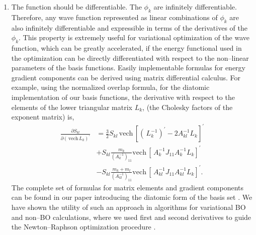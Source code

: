 \begin{enumerate}
\item  
The function should be differentiable.
The $\phi_k$ are infinitely 
differentiable. Therefore, any wave function 
represented as linear combinations 
of $\phi_k$ are also infinitely
differentiable and expressible in terms 
of the derivatives of the $\phi_k$.
This property is extremely useful for
variational optimization of the wave function,
which can be greatly accelerated, if 
the energy functional used in the optimization
can be directly differentiated with respect
to the non--linear parameters of the basis 
functions.
Easily implementable formulas for energy  gradient 
components can be derived
using matrix differential 
calculus\cite{Kinghorn95a}.
For example, using the normalized overlap formula, for the diatomic
implementation of our basis functions, the derivative with
respect to the elements of the lower triangular matrix $L_{k}$, 
(the Cholesky factors of the exponent matrix) is,
\begin{align}
\frac{\partial S_{kl}}{\partial\left(  \,\mathrm{vech}\,L_{k}\right)
^{\prime}}  &  =\frac{3}{2}S_{kl}\,\mathrm{vech}\,\left[  \left(  \,L_{k}%
^{-1}\right)  ^{\prime}-2A_{kl}^{-1}L_{k}\right]  ^{\prime}\nonumber\\
&  +S_{kl}\frac{m_{k}}{\left(  A_{k}^{-1}\right)  _{11}}\mathrm{vech}\,\left[
\,A_{k}^{-1}J_{11}A_{k}^{-1}L_{k}\right]  ^{\prime}\nonumber\\
&  -S_{kl}\frac{m_{k}+m_{l}}{\left(  A_{kl}^{-1}\right)  _{11}}\mathrm{vech}%
\,\left[  \,A_{kl}^{-1}J_{11}A_{kl}^{-1}L_{k}\right]  ^{\prime}.
\end{align}
The complete set of formulas for matrix elements and gradient
components can be
found in our paper introducing the diatomic form of the basis set 
\cite{kinghorn99a}.
We have shown the utility of such an approach
in algorithms for variational BO and non--BO calculations,
where we used first and second derivatives to guide
the Newton--Raphson optimization procedure
\cite{A8,A14,A21,A38,kozlowski92b}. 


\end{enumerate}
